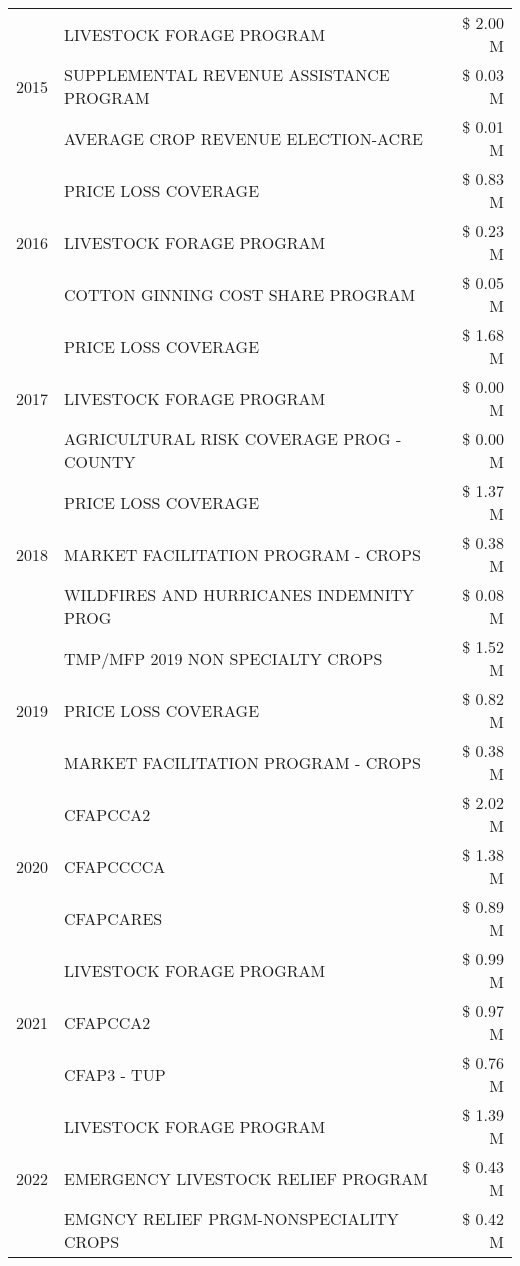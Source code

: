 \begin{tabular}{llr}
\cline{1-3}
\multirow[t]{3}{*}{2015} & LIVESTOCK FORAGE PROGRAM & \$ 2.00 M \\
 & SUPPLEMENTAL REVENUE ASSISTANCE PROGRAM & \$ 0.03 M \\
 & AVERAGE CROP REVENUE ELECTION-ACRE & \$ 0.01 M \\
\cline{1-3}
\multirow[t]{3}{*}{2016} & PRICE LOSS COVERAGE & \$ 0.83 M \\
 & LIVESTOCK FORAGE PROGRAM & \$ 0.23 M \\
 & COTTON GINNING COST SHARE PROGRAM & \$ 0.05 M \\
\cline{1-3}
\multirow[t]{3}{*}{2017} & PRICE LOSS COVERAGE & \$ 1.68 M \\
 & LIVESTOCK FORAGE PROGRAM & \$ 0.00 M \\
 & AGRICULTURAL RISK COVERAGE PROG - COUNTY & \$ 0.00 M \\
\cline{1-3}
\multirow[t]{3}{*}{2018} & PRICE LOSS COVERAGE & \$ 1.37 M \\
 & MARKET FACILITATION PROGRAM - CROPS & \$ 0.38 M \\
 & WILDFIRES AND HURRICANES INDEMNITY PROG & \$ 0.08 M \\
\cline{1-3}
\multirow[t]{3}{*}{2019} & TMP/MFP 2019 NON SPECIALTY CROPS & \$ 1.52 M \\
 & PRICE LOSS COVERAGE & \$ 0.82 M \\
 & MARKET FACILITATION PROGRAM - CROPS & \$ 0.38 M \\
\cline{1-3}
\multirow[t]{3}{*}{2020} & CFAPCCA2 & \$ 2.02 M \\
 & CFAPCCCCA & \$ 1.38 M \\
 & CFAPCARES & \$ 0.89 M \\
\cline{1-3}
\multirow[t]{3}{*}{2021} & LIVESTOCK FORAGE PROGRAM & \$ 0.99 M \\
 & CFAPCCA2 & \$ 0.97 M \\
 & CFAP3 - TUP & \$ 0.76 M \\
\cline{1-3}
\multirow[t]{3}{*}{2022} & LIVESTOCK FORAGE PROGRAM & \$ 1.39 M \\
 & EMERGENCY LIVESTOCK RELIEF PROGRAM & \$ 0.43 M \\
 & EMGNCY RELIEF PRGM-NONSPECIALITY CROPS & \$ 0.42 M \\
\cline{1-3}
\bottomrule
\end{tabular}
